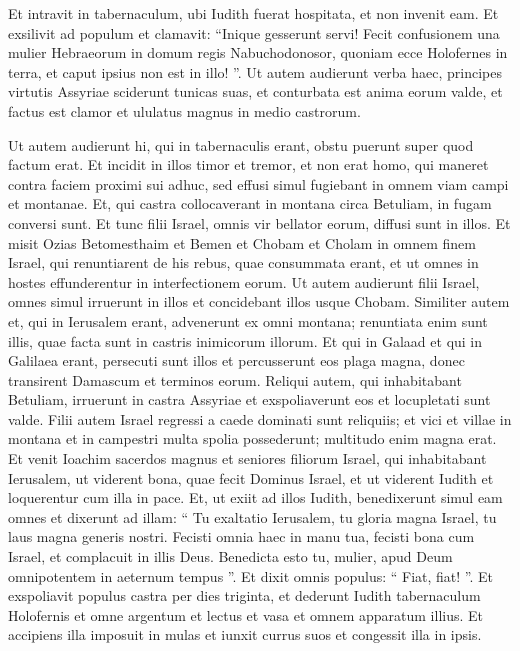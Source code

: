 \begin{biblechapter}
\begin{biblechapter}
\begin{biblechapter}
\begin{biblechapter}
\begin{biblechapter}
\begin{biblechapter}
\begin{biblechapter}
\begin{biblechapter}
\begin{biblechapter}
\begin{biblechapter}
\begin{biblechapter}
\begin{biblechapter}
\begin{biblechapter}
\begin{biblechapter}
\verse Et intravit in tabernaculum, ubi Iudith fuerat hospitata, et non invenit eam. Et exsilivit ad populum et clamavit: 
\verse “Inique gesserunt servi! Fecit confusionem una mulier Hebraeorum in domum regis Nabuchodonosor, quoniam ecce Holofernes in terra, et caput ipsius non est in illo! ”. 
\verse Ut autem audierunt verba haec, principes virtutis Assyriae sciderunt tunicas suas, et conturbata est anima eorum valde, et factus est clamor et ululatus magnus in medio castrorum.
 
\begin{biblechapter}
\verse Ut autem audierunt hi, qui in tabernaculis erant, obstu puerunt super quod factum erat. 
\verse Et incidit in illos timor et tremor, et non erat homo, qui maneret contra faciem proximi sui adhuc, sed effusi simul fugiebant in omnem viam campi et montanae. 
\verse Et, qui castra collocaverant in montana circa Betuliam, in fugam conversi sunt. Et tunc filii Israel, omnis vir bellator eorum, diffusi sunt in illos. 
\verse Et misit Ozias Betomesthaim et Bemen et Chobam et Cholam in omnem finem Israel, qui renuntiarent de his rebus, quae consummata erant, et ut omnes in hostes effunderentur in interfectionem eorum. 
 \verse Ut autem audierunt filii Israel, omnes simul irruerunt in illos et concidebant illos usque Chobam. Similiter autem et, qui in Ierusalem erant, advenerunt ex omni montana; renuntiata enim sunt illis, quae facta sunt in castris inimicorum illorum. Et qui in Galaad et qui in Galilaea erant, persecuti sunt illos et percusserunt eos plaga magna, donec transirent Damascum et terminos eorum. 
\verse Reliqui autem, qui inhabitabant Betuliam, irruerunt in castra Assyriae et exspoliaverunt eos et locupletati sunt valde. 
\verse Filii autem Israel regressi a caede dominati sunt reliquiis; et vici et villae in montana et in campestri multa spolia possederunt; multitudo enim magna erat.
 \verse Et venit Ioachim sacerdos magnus et seniores filiorum Israel, qui inhabitabant Ierusalem, ut viderent bona, quae fecit Dominus Israel, et ut viderent Iudith et loquerentur cum illa in pace. 
\verse Et, ut exiit ad illos Iudith, benedixerunt simul eam omnes et dixerunt ad illam: “ Tu exaltatio Ierusalem, tu gloria magna Israel, tu laus magna generis nostri. 
\verse Fecisti omnia haec in manu tua, fecisti bona cum Israel, et complacuit in illis Deus. Benedicta esto tu, mulier, apud Deum omnipotentem in aeternum tempus ”. Et dixit omnis populus: “ Fiat, fiat! ”.
 \verse Et exspoliavit populus castra per dies triginta, et dederunt Iudith tabernaculum Holofernis et omne argentum et lectus et vasa et omnem apparatum illius. Et accipiens illa imposuit in mulas et iunxit currus suos et congessit illa in ipsis. 

\end{biblechapter}
\end{biblechapter}
\end{biblechapter}
\end{biblechapter}
\end{biblechapter}
\end{biblechapter}
\end{biblechapter}
\end{biblechapter}
\end{biblechapter}
\end{biblechapter}
\end{biblechapter}
\end{biblechapter}
\end{biblechapter}
\end{biblechapter}
\end{biblechapter}
